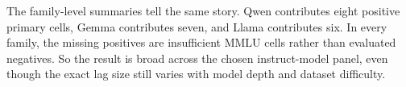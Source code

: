 \begin{table}[t]
\centering
\small

\caption{\textbf{Primary-rule summary by dataset.} ARC-Challenge and CommonsenseQA are positive in every evaluable model-dataset cell. The only non-positive outcomes are \emph{insufficient n} cells from the small MMLU abstract algebra slice.}
\label{tab:primary-summary}
\end{table}

The family-level summaries tell the same story. Qwen contributes eight positive primary cells, Gemma contributes seven, and Llama contributes six. In every family, the missing positives are insufficient MMLU cells rather than evaluated negatives. So the result is broad across the chosen instruct-model panel, even though the exact lag size still varies with model depth and dataset difficulty.

\FloatBarrier
